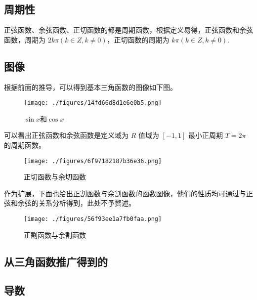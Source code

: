 \subsection{周期性}

正弦函数、余弦函数、正切函数的都是周期函数，根据定义易得，正弦函数和余弦函数，周期为 $2k\pi(k\in Z,k\neq0)$，正切函数的周期为 $k\pi(k\in Z,k\neq0)$.


\subsection{图像}
根据前面的推导，可以得到基本三角函数的图像如下图。
\begin{figure}[ht]
\centering
\texttt{[image: ./figures/14fd66d8d1e6e0b5.png]}
\caption{$\sin x$和$\cos x$} \label{fig_HsTFFv_1}
\end{figure}
可以看出正弦函数和余弦函数是定义域为 $R$ 值域为 $[-1,1]$ 最小正周期 $T = 2\pi$ 的周期函数。

\begin{figure}[ht]
\centering
\texttt{[image: ./figures/6f97182187b36e36.png]}
\caption{正切函数与余切函数} \label{fig_HsTFFv_3}
\end{figure}

作为扩展，下面也给出正割函数与余割函数的函数图像，他们的性质均可通过与正弦和余弦的关系分析得到，此处不予赘述。

\begin{figure}[ht]
\centering
\texttt{[image: ./figures/56f93ee1a7fb0faa.png]}
\caption{正割函数与余割函数} \label{fig_HsTFFv_2}
\end{figure}

\subsection{从三角函数推广得到的}

\subsection{导数}